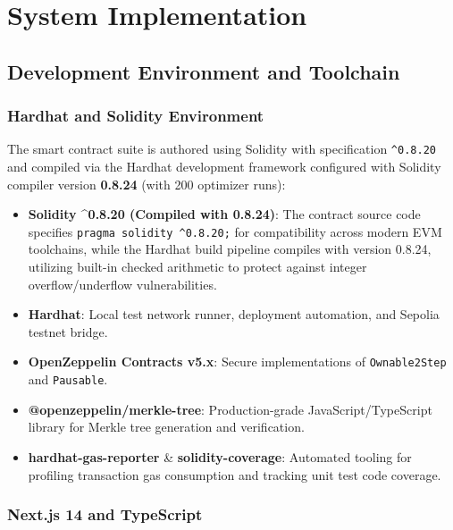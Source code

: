 
\chapter{System Implementation}

\section{Development Environment and Toolchain}

\subsection{Hardhat and Solidity Environment}

The smart contract suite is authored using Solidity with specification \texttt{\textasciicircum 0.8.20} and compiled via the Hardhat development framework configured with Solidity compiler version \textbf{0.8.24} (with 200 optimizer runs):
\begin{itemize}
    \item \textbf{Solidity \textasciicircum 0.8.20 (Compiled with 0.8.24)}: The contract source code specifies \texttt{pragma solidity \textasciicircum 0.8.20;} for compatibility across modern EVM toolchains, while the Hardhat build pipeline compiles with version 0.8.24, utilizing built-in checked arithmetic to protect against integer overflow/underflow vulnerabilities.
    \item \textbf{Hardhat}: Local test network runner, deployment automation, and Sepolia testnet bridge.
    \item \textbf{OpenZeppelin Contracts v5.x}: Secure implementations of \texttt{Ownable2Step} and \texttt{Pausable}.
    \item \textbf{@openzeppelin/merkle-tree}: Production-grade JavaScript/TypeScript library for Merkle tree generation and verification.
    \item \textbf{hardhat-gas-reporter} \& \textbf{solidity-coverage}: Automated tooling for profiling transaction gas consumption and tracking unit test code coverage.
\end{itemize}

\subsection{Next.js 14 and TypeScript}

